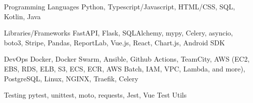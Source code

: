 
\begin{cvskills}

  \cvskill
    {Programming Languages}
    {Python, Typescript/Javascript, HTML/CSS, SQL, Kotlin, Java}

  \cvskill
    {Libraries/Frameworks}
    {FastAPI, Flask, SQLAlchemy, mypy, Celery, asyncio, boto3, Stripe, Pandas, ReportLab, Vue.js, React, Chart.js, \newline Android SDK}

  \cvskill
    {DevOps}
    {Docker, Docker Swarm, Ansible, Github Actions, TeamCity, AWS (EC2, EBS, RDS, ELB, S3, ECS, ECR, AWS Batch, \newline IAM, VPC, Lambda, and more), PostgreSQL, Linux, NGINX, Traefik, Celery}

  \cvskill
    {Testing}
    {pytest, unittest, moto, requests, Jest, Vue Test Utils}

\end{cvskills}